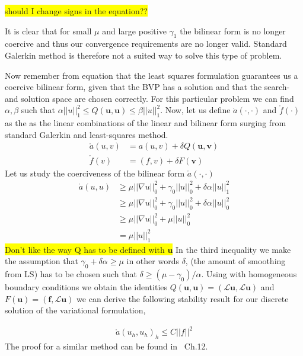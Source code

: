 \colorbox{yellow}{should I change signs in the equation?? } 


It is clear that for small $\mu$ and large positive $\gamma_1$ the bilinear form is no longer coercive and thus our convergence requirements are no longer valid. Standard Galerkin method is therefore not a suited way to solve this type of problem. 

Now remember from equation  that the least squares formulation guarantees us a coercive bilinear form, given that the BVP has a solution and that the search- and solution space are chosen correctly. For this particular problem we can find $\alpha,\beta$ such that $\alpha||u||_1^2 \leq Q(\mathbf{u},\mathbf{u}) \leq \beta||u||_1^2 $.
Now, let us define $\mathring{a}(\cdot,\cdot)$ and $\mathring{f}(\cdot)$ as the as the linear combinations of the linear and bilinear form surging from standard Galerkin and least-squares method. 
\begin{align}
	\mathring{a}(u,v) &= a(u,v) + \delta Q(\mathbf{u},\mathbf{\mathbf{v}}) \\
	 \mathring{f}(v) &= (f,v) + \delta F(\mathbf{\mathbf{v}}) 
	\label{eq:GLS}
\end{align}
Let us study the coerciveness of the bilinear form $\mathring{a}(\cdot,\cdot)$
\begin{align}
	\mathring{a}(u,u) &\geq \mu ||\nabla u||_0^2+\gamma_0||u||_0^2+\delta \alpha ||u||^2_1 \\
	&\geq \mu ||\nabla u||_0^2+\gamma_0||u||_0^2+\delta \alpha ||u||^2_0 \\
	&\geq \mu ||\nabla u||_0^2+\mu ||u||_0^2 \\
	&= \mu ||u||^2_1
	\label{eq:coercivity}
\end{align}
\colorbox{yellow}{Don't like the way Q has to be defined with $\mathbf{u}$}
In the third inequality we make the assumption that $\gamma_0+\delta \alpha \geq \mu $ in other words $\delta$, (the amount of smoothing from LS) has to be chosen such that $\delta \geq (\mu-\gamma_0)/\alpha$.
Using  with homogeneous boundary conditions we obtain the identities $Q(\mathbf{u},\mathbf{u}) = (\mathcal{L}\mathbf{u},\mathcal{L}\mathbf{u})$ and $F(\mathbf{u}) = (\mathbf{f},\mathcal{L}\mathbf{u})$ we can derive the following stability result for our discrete solution of the variational formulation, 
	
\begin{align}
	\mathring{a}(u_h,u_h)_h \leq C ||f||^2
	\label{eq:stabilityResult}
\end{align}
The proof for a similar method can be found in~\cite{Quarteroni} Ch.12. 

